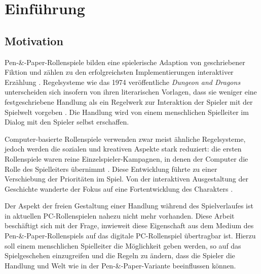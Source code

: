 \chapter{Einführung}


\section{Motivation}
\label{sec:Motivation}

Pen-\&-Paper-Rollenspiele bilden eine spielerische Adaption von geschriebener Fiktion und zählen zu den erfolgreichsten Implementierungen interaktiver Erzählung \cite{Tychsen2006}. Regelsysteme wie das 1974 veröffentliche \emph{Dungeon and Dragons} unterscheiden sich insofern von ihren literarischen Vorlagen, dass sie weniger eine festgeschriebene Handlung als ein Regelwerk zur Interaktion der Spieler mit der Spielwelt vorgeben \cite{Apperley2006}. Die Handlung wird von einem menschlichen Spielleiter im Dialog mit den Spieler selbst erschaffen.

Computer-basierte Rollenspiele verwenden zwar meist ähnliche Regelsysteme, jedoch werden die sozialen und kreativen Aspekte stark reduziert: die ersten Rollenspiele waren reine Einzelspieler-Kampagnen, in denen der Computer die Rolle des Spielleiters übernimmt \cite{Apperley2006}. Diese Entwicklung führte zu einer Verschiebung der Prioritäten im Spiel. Von der interaktiven Ausgestaltung der Geschichte wanderte der Fokus auf eine Fortentwicklung des Charakters .

Der Aspekt der freien Gestaltung einer Handlung während des Spielverlaufes ist in aktuellen PC-Rollenspielen nahezu nicht mehr vorhanden. Diese Arbeit beschäftigt sich mit der Frage, inwieweit diese Eigenschaft aus dem Medium des Pen-\&-Paper-Rollenspiels auf das digitale PC-Rollenspiel übertragbar ist. Hierzu soll einem menschlichen Spielleiter die Möglichkeit geben werden, so auf das Spielgeschehen einzugreifen und die Regeln zu ändern, dass die Spieler die Handlung und Welt wie in der Pen-\&-Paper-Variante beeinflussen können.

